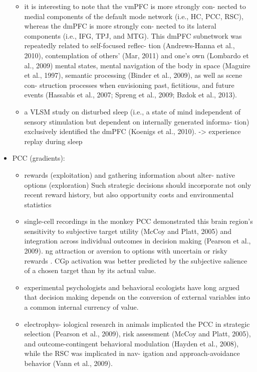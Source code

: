 \documentclass{article} %
\begin{document}
\begin{itemize}
\begin{itemize}
\item
it is interesting to note that the vmPFC is more strongly con- nected to medial components of the default mode network (i.e., HC, PCC, RSC), whereas the dmPFC is more strongly con- nected to its lateral components (i.e., IFG, TPJ, and MTG). This dmPFC subnetwork was repeatedly related to self-focused reflec- tion (Andrews-Hanna et al., 2010), contemplation of others’ (Mar, 2011) and one’s own (Lombardo et al., 2009) mental states, mental navigation of the body in space (Maguire et al., 1997), semantic processing (Binder et al., 2009), as well as scene con- struction processes when envisioning past, fictitious, and future events (Hassabis et al., 2007; Spreng et al., 2009; Bzdok et al., 2013).


\item
a VLSM study on disturbed sleep (i.e., a state of mind independent of sensory stimulation but dependent on internally generated informa- tion) exclusively identified the dmPFC (Koenigs et al., 2010).
-> experience replay during sleep

\end{itemize}

  \item
    PCC (gradients):
    \begin{itemize}
      \item rewards (exploitation) and gathering information about alter- native options (exploration)
Such strategic decisions should incorporate not only recent reward history, but also opportunity costs and environmental statistics

\item
single-cell recordings in the monkey PCC demonstrated this brain region's sensitivity to subjective target utility (McCoy and Platt, 2005) and integration across individual outcomes in decision making (Pearson et al., 2009).
ng attraction or aversion to options with uncertain or risky rewards
. CGp activation was better predicted by the
subjective salience of a chosen target than by its actual value.

\item
experimental psychologists and behavioral ecologists
have long argued that decision making depends on the conversion
of external variables into a common internal currency of value.

\item
electrophys- iological research in animals implicated the PCC in strategic selection (Pearson et al., 2009), risk assessment (McCoy and Platt, 2005), and outcome-contingent behavioral modulation (Hayden et al., 2008), while the RSC was implicated in nav- igation and approach-avoidance behavior (Vann et al., 2009).


\end{itemize}
\end{itemize}
\end{document}
